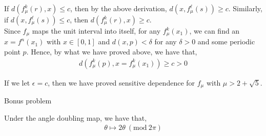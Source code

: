 \documentclass[12pt]{article}
\newenvironment{problem}[2][Problem]{\begin{trivlist}
\item[\hskip \labelsep {\bfseries #1}\hskip \labelsep {\bfseries #2.}]}{\end{trivlist}}
\newcommand{\Mod}[1]{\ (\mathrm{mod}\ #1)}
\begin{document}
If $d(f_{\mu}^k(r), x) \leq c$, then by the above derivation, $d(x, f_{\mu}^{\ell}(s)) \geq c$. Similarly, if $d(x, f_{\mu}^{\ell}(s)) \leq c$, then  $d(f_{\mu}^k(r), x) \geq c$.\\

Since $f_{\mu}$ maps the unit interval into itself, for any $f_{\mu}^k(x_1)$, we can find an $x = f^n(x_1)$ with $x \in [0, 1]$ and $d(x, p) < \delta$ for any $\delta > 0$ and some periodic point $p$. Hence, by what we have proved above, we have that,
\begin{align*}
d(f_{\mu}^k(p), x = f_{\mu}^k(x_1)) \geq c > 0
\end{align*}

If we let $\epsilon = c$, then we have proved sensitive dependence for $f_{\mu}$ with $\mu > 2 + \sqrt{5}$.

\begin{problem}{4}
Bonus problem
\end{problem}

Under the angle doubling map, we have that,
\begin{align*}
\theta \mapsto 2\theta \Mod{2\pi}
\end{align*}
\end{document}
